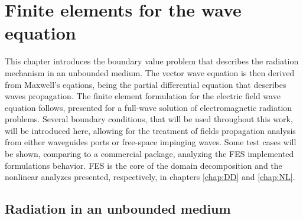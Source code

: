 \thispagestyle{empty}
\cleardoublepage
\graphicspath{{img/ch1/}}
\chapter{Finite elements for the wave equation} \label{chap:FE}

\par This chapter introduces the boundary value problem that describes the radiation mechanism in an unbounded medium. The vector wave equation is then derived from Maxwell's eqations, being the partial differential equation that describes waves propagation. The finite element formulation for the electric field wave equation follows, presented for a full-wave solution of electromagnetic radiation problems. Several boundary conditions, that will be used throughout this work, will be introduced here, allowing for the treatment of fields propagation analysis from either waveguides ports or free-space impinging waves. Some test cases will be shown, comparing to a commercial package, analyzing the FES implemented formulations behavior. FES is the core of the domain decomposition and the nonlinear analyzes presented, respectively, in chapters \ref{chap:DD} and \ref{chap:NL}.


\section{Radiation in an unbounded medium}

